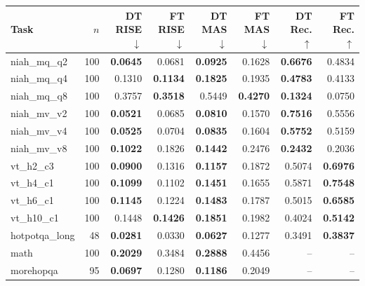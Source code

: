 \begin{tabular}{lrrrrrrr}
\toprule
Task & $n$ & DT RISE $\downarrow$ & FT RISE $\downarrow$ & DT MAS $\downarrow$ & FT MAS $\downarrow$ & DT Rec. $\uparrow$ & FT Rec. $\uparrow$ \\
\midrule
niah\_mq\_q2 & 100 & \textbf{0.0645} & 0.0681 & \textbf{0.0925} & 0.1628 & \textbf{0.6676} & 0.4834 \\
niah\_mq\_q4 & 100 & 0.1310 & \textbf{0.1134} & \textbf{0.1825} & 0.1935 & \textbf{0.4783} & 0.4133 \\
niah\_mq\_q8 & 100 & 0.3757 & \textbf{0.3518} & 0.5449 & \textbf{0.4270} & \textbf{0.1324} & 0.0750 \\
niah\_mv\_v2 & 100 & \textbf{0.0521} & 0.0685 & \textbf{0.0810} & 0.1570 & \textbf{0.7516} & 0.5556 \\
niah\_mv\_v4 & 100 & \textbf{0.0525} & 0.0704 & \textbf{0.0835} & 0.1604 & \textbf{0.5752} & 0.5159 \\
niah\_mv\_v8 & 100 & \textbf{0.1022} & 0.1826 & \textbf{0.1442} & 0.2476 & \textbf{0.2432} & 0.2036 \\
vt\_h2\_c3 & 100 & \textbf{0.0900} & 0.1316 & \textbf{0.1157} & 0.1872 & 0.5074 & \textbf{0.6976} \\
vt\_h4\_c1 & 100 & \textbf{0.1099} & 0.1102 & \textbf{0.1451} & 0.1655 & 0.5871 & \textbf{0.7548} \\
vt\_h6\_c1 & 100 & \textbf{0.1145} & 0.1224 & \textbf{0.1483} & 0.1787 & 0.5015 & \textbf{0.6585} \\
vt\_h10\_c1 & 100 & 0.1448 & \textbf{0.1426} & \textbf{0.1851} & 0.1982 & 0.4024 & \textbf{0.5142} \\
hotpotqa\_long & 48 & \textbf{0.0281} & 0.0330 & \textbf{0.0627} & 0.1277 & 0.3491 & \textbf{0.3837} \\
math & 100 & \textbf{0.2029} & 0.3484 & \textbf{0.2888} & 0.4456 & -- & -- \\
morehopqa & 95 & \textbf{0.0697} & 0.1280 & \textbf{0.1186} & 0.2049 & -- & -- \\
\bottomrule
\end{tabular}
